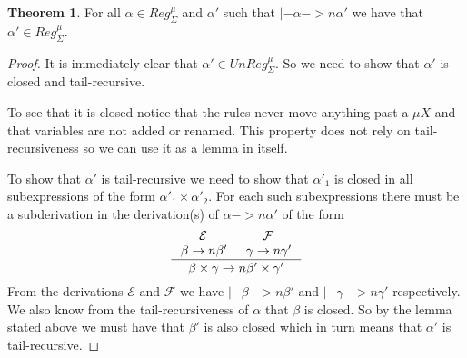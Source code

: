 \documentclass[a4paper, oneside]{memoir}
\theoremstyle{definition}
\newtheorem{theorem}{Theorem}
\begin{document}
\begin{theorem}
  For all $\alpha \in Reg_{\Sigma}^{\mu}$ and $\alpha'$ such that $|- \alpha ->n
  \alpha'$ we have that $\alpha' \in Reg_{\Sigma}^{\mu}$.

  \begin{proof}
    It is immediately clear that $\alpha' \in UnReg_{\Sigma}^{\mu}$. So we need
    to show that $\alpha'$ is closed and tail-recursive.

    To see that it is closed notice that the rules never move anything past a
    $\mu X$ and that variables are not added or renamed. This property does not
    rely on tail-recursiveness so we can use it as a lemma in itself.

    To show that $\alpha'$ is tail-recursive we need to show that $\alpha'_1$ is
    closed in all subexpressions of the form $\alpha'_1 \times \alpha'_2$.
    For each such subexpressions there must be a subderivation in the derivation(s)
    of $\alpha ->n \alpha'$ of the form
    \[
    \inference{\mathcal{E} & \mathcal{F} \\ \beta ->n \beta' & \gamma ->n
      \gamma'}{\beta \times \gamma ->n \beta' \times \gamma'}
    \]
    From the derivations $\mathcal{E}$ and $\mathcal{F}$ we have $|- \beta ->n
    \beta'$ and $|- \gamma ->n \gamma'$ respectively. We also know from the
    tail-recursiveness of $\alpha$ that $\beta$ is closed. So by the lemma
    stated above we must have that $\beta'$ is also closed which in turn means
    that $\alpha'$ is tail-recursive.
  \end{proof}
\end{theorem}
\end{document}
